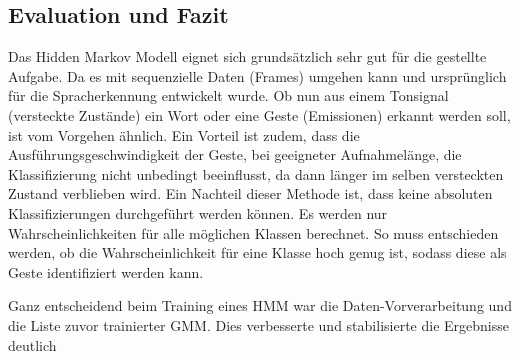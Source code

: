 \subsection{Evaluation und Fazit}  \label{sec:result}
Das Hidden Markov Modell eignet sich grundsätzlich sehr gut für die gestellte Aufgabe. Da es mit sequenzielle Daten (Frames) umgehen 
kann und ursprünglich für die Spracherkennung entwickelt wurde. Ob nun aus einem Tonsignal (versteckte Zustände) ein Wort oder 
eine Geste (Emissionen) erkannt werden soll, ist vom Vorgehen ähnlich. Ein Vorteil ist zudem, dass die Ausführungsgeschwindigkeit
 der Geste, bei geeigneter Aufnahmelänge, die Klassifizierung nicht unbedingt beeinflusst, da dann länger im selben versteckten 
 Zustand verblieben wird.
Ein Nachteil dieser Methode ist, dass keine absoluten Klassifizierungen
durchgeführt werden können. Es werden nur Wahrscheinlichkeiten für alle möglichen Klassen berechnet.
So muss entschieden werden, ob die Wahrscheinlichkeit für eine Klasse hoch genug ist, sodass diese als Geste identifiziert werden kann.

Ganz entscheidend beim Training eines \acl{HMM} war die Daten-Vorverarbeitung und die Liste zuvor trainierter \acl{GMM}. 
Dies verbesserte und stabilisierte die Ergebnisse deutlich


